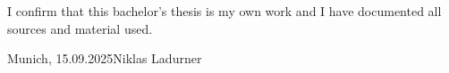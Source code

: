 
\vspace*{\fill}

\noindent I confirm that this bachelor's thesis is my own work and I have documented all sources and material used.

\vspace*{\fill}

\noindent Munich, 15.09.2025\hfill Niklas Ladurner

\MediaOptionLogic